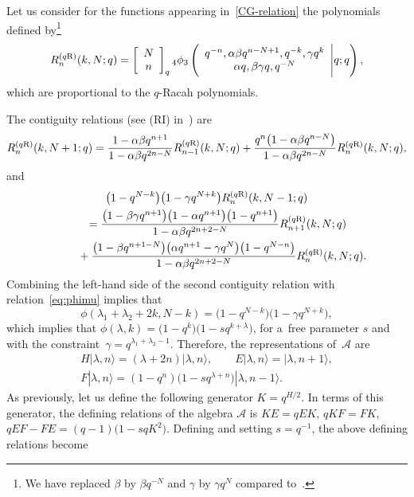 \documentclass[pdftex]{sigma}
\numberwithin{equation}{section}
\theoremstyle{definition}
\begin{document}
Let us consider for the functions appearing in~\eqref{CG-relation} the polynomials defined by\footnote{We have replaced $\beta$ by $\beta q^{-N}$ and $\gamma$ by $\gamma q^N$ compared to~\cite{contiguity}.}
\[R^{(q{\rm R})}_n(k,N;q)=\left[\begin{array}{c} N \\ n \end{array}\right]_q
{}_4\phi_3\left(\begin{array}{c} q^{-n}, \alpha\beta q^{n-N+1}, q^{-k}, \gamma q^{k} \\ \alpha q, \beta\gamma q, q^{-N}\end{array}\Bigg\vert q;q\right),\]
which are proportional to the $q$-Racah polynomials.

The contiguity relations (see (RI) in~\cite{contiguity}) are
\[
R^{(q{\rm R})}_n(k,N+1;q)=\frac{1-\alpha\beta q^{n+1}}{1-\alpha\beta q^{2n-N}}R^{(q{\rm R})}_{n-1}(k,N;q)+\frac{q^n\bigl(1-\alpha\beta q^{n-N}\bigr)}{1-\alpha\beta q^{2n-N}}R^{(q{\rm R})}_n(k,N;q),
\]
and
\begin{gather*}
\bigl(1-q^{N-k}\bigr)\bigl(1-\gamma q^{N+k}\bigr)R^{(q{\rm R})}_n(k,N-1;q)\\
\qquad=\frac{\bigl(1-\beta\gamma q^{n+1}\bigr)\bigl(1-\alpha q^{n+1}\bigr)\bigl(1-q^{n+1}\bigr)}{1-\alpha\beta q^{2n+2-N}}R^{(q{\rm R})}_{n+1}(k,N;q)\\
\phantom{\qquad=}{}+\frac{\bigl(1-\beta q^{n+1-N}\bigr)\bigl(\alpha q^{n+1}-\gamma q^N\bigr)\bigl(1-q^{N-n}\bigr)}{1-\alpha\beta q^{2n+2-N}}R^{(q{\rm R})}_n(k,N;q).
\end{gather*}
Combining the left-hand side of the second contiguity relation with relation~\eqref{eq:phimu} implies that
\[\phi(\lambda_1+\lambda_2+2k,N-k)=\bigl(1-q^{N-k}\bigr)\bigl(1-\gamma q^{N+k}\bigr),\]
which implies that
$\phi(\lambda,k)=\bigl(1-q^k\bigr)\bigl(1-s q^{k+\lambda}\bigr)$,
for a~free parameter $s$ and with the constraint~${\gamma=q^{\lambda_1+\lambda_2-1}}$.
Therefore, the representations of~$\mathcal{A}$ are
\begin{gather*}
H|\lambda,n\rangle=(\lambda+2n)|\lambda,n\rangle, \qquad
E|\lambda,n\rangle=|\lambda,n+1\rangle, \\
F|\lambda,n\rangle=(1-q^n)\bigl(1- sq^{\lambda+n}\bigr)|\lambda,n-1\rangle.\end{gather*}
As previously, let us define the following generator $ K=q^{H/2}$.
In terms of this generator, the defining relations of the algebra $\mathcal{A}$ is
$
KE=qEK$, $ qKF=FK$, $ qEF-FE=(q-1)\big(1-sqK^2\big)$.
Defining  and setting $s=q^{-1}$, the above defining relations become
\end{document}
